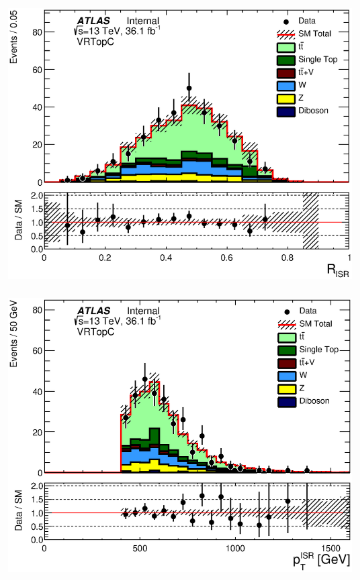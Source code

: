 \pagebreak

\begin{figure}[h!]
  \centering
        \begin{subfigure}[b]{0.40\textwidth}  
	    	\includegraphics[width=\textwidth]{figures/ttbar/postfit/CA_RISR_VRTopC}
               \caption{ }
    \end{subfigure}
    	\begin{subfigure}[b]{0.40\textwidth}  
   		\includegraphics[width=\textwidth]{figures/ttbar/postfit/CA_pTISR_VRTopC}
               \caption{ }
    \end{subfigure}
    	\begin{subfigure}[b]{0.40\textwidth}  

\end{subfigure}
\end{figure}
